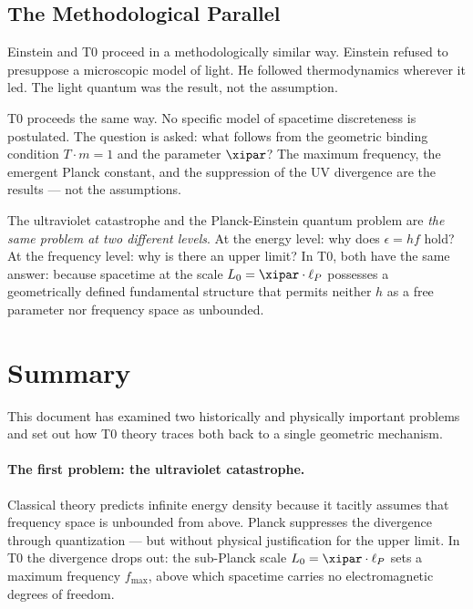 \subsection{The Methodological Parallel}

Einstein and T0 proceed in a methodologically similar way. Einstein 
refused to presuppose a microscopic model of light. He followed thermodynamics 
wherever it led. The light quantum was the result, not the assumption.

T0 proceeds the same way. No specific model of spacetime discreteness is postulated. 
The question is asked: what follows from the geometric binding condition $T \cdot m = 1$ 
and the parameter $\xipar$? The maximum frequency, the emergent Planck constant, 
and the suppression of the UV divergence are the results — not the assumptions.

\begin{revolutionary}
    The ultraviolet catastrophe and the Planck-Einstein quantum problem are 
    \emph{the same problem at two different levels}. At the energy level: why does 
    $\epsilon = hf$ hold? At the frequency level: why is there an upper limit? In T0, 
    both have the same answer: because spacetime at the scale $L_0 = \xipar \cdot \ell_P$ 
    possesses a geometrically defined fundamental structure that permits neither $h$ 
    as a free parameter nor frequency space as unbounded.
\end{revolutionary}

\clearpage

\section{Summary}
\label{sec:summary}

This document has examined two historically and physically important problems and 
set out how T0 theory traces both back to a single geometric mechanism.

\paragraph{The first problem: the ultraviolet catastrophe.}
Classical theory predicts infinite energy density because it tacitly assumes that 
frequency space is unbounded from above. Planck suppresses the divergence through 
quantization — but without physical justification for the upper limit. In T0 
the divergence drops out: the sub-Planck scale $L_0 = \xipar \cdot \ell_P$ 
sets a maximum frequency $f_{\max}$, above which spacetime carries no electromagnetic 
degrees of freedom.

